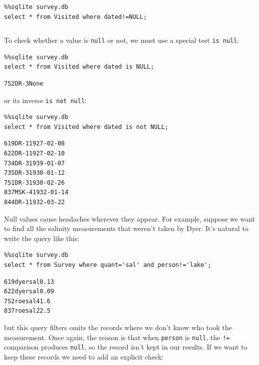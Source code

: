 \documentclass{book}
\begin{document}
\begin{verbatim}
\end{verbatim}

\begin{verbatim}
%%sqlite survey.db
select * from Visited where dated!=NULL;
\end{verbatim}

\begin{verbatim}
\end{verbatim}

To check whether a value is \texttt{null} or not, we must use a special
test \texttt{is null}:

\begin{verbatim}
%%sqlite survey.db
select * from Visited where dated is NULL;
\end{verbatim}

\begin{verbatim}
752DR-3None
\end{verbatim}

or its inverse \texttt{is not null}:

\begin{verbatim}
%%sqlite survey.db
select * from Visited where dated is not NULL;
\end{verbatim}

\begin{verbatim}
619DR-11927-02-08
622DR-11927-02-10
734DR-31939-01-07
735DR-31930-01-12
751DR-31930-02-26
837MSK-41932-01-14
844DR-11932-03-22
\end{verbatim}

Null values cause headaches wherever they appear. For example, suppose
we want to find all the salinity measurements that weren't taken by
Dyer. It's natural to write the query like this:

\begin{verbatim}
%%sqlite survey.db
select * from Survey where quant='sal' and person!='lake';
\end{verbatim}

\begin{verbatim}
619dyersal0.13
622dyersal0.09
752roesal41.6
837roesal22.5
\end{verbatim}

but this query filters omits the records where we don't know who took
the measurement. Once again, the reason is that when \texttt{person} is
\texttt{null}, the \texttt{!=} comparison produces \texttt{null}, so the
record isn't kept in our results. If we want to keep these records we
need to add an explicit check:
\end{document}
